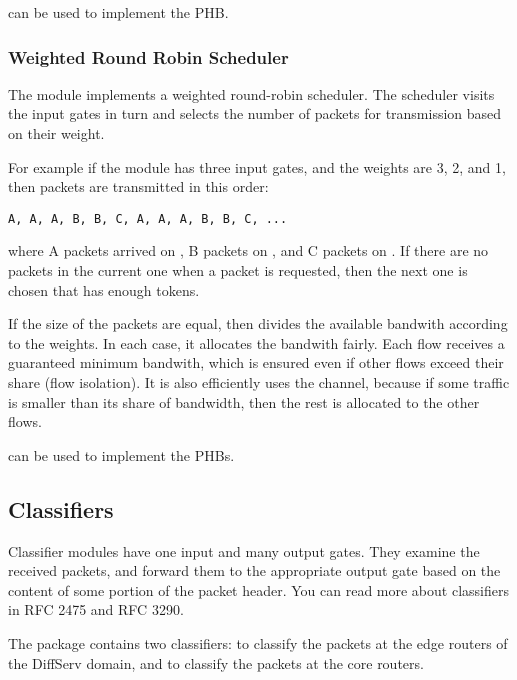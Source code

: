  can be used to implement
the  PHB.

\subsubsection*{Weighted Round Robin Scheduler}

The  module implements a weighted
round-robin scheduler. The scheduler visits the input gates
in turn and selects the number of packets for transmission
based on their weight.

For example if the module has three input gates, and the weights
are 3, 2, and 1, then packets are transmitted in this order:

\begin{verbatim}
A, A, A, B, B, C, A, A, A, B, B, C, ...
\end{verbatim}

where A packets arrived on , B packets on ,
and C packets on . If there are no packets in the current
one when a packet is requested, then the next one is chosen that has
enough tokens.

If the size of the packets are equal, then 
divides the available bandwith according to the weights. In each
case, it allocates the bandwith fairly. Each flow receives a guaranteed
minimum bandwith, which is ensured even if other flows exceed
their share (flow isolation). It is also efficiently uses the
channel, because if some traffic is smaller than its share of
bandwidth, then the rest is allocated to the other flows.

 can be used to implement the  PHBs.

\subsection{Classifiers}
\label{sec:diffserv:classifiers}

Classifier modules have one input and many output gates.
They examine the received packets, and forward them to the
appropriate output gate based on the content of some portion
of the packet header. You can read more about classifiers
in RFC 2475 and RFC 3290.

The  package contains two
classifiers:  to classify
the packets at the edge routers of the DiffServ domain, and
 to classify the packets
at the core routers.


